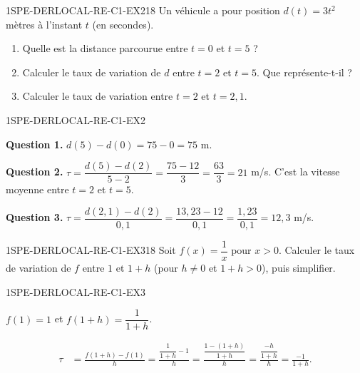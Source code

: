 \begin{exercice}{1SPE-DERLOCAL-RE-C1-EX2}{1}{8}
Un véhicule a pour position $d(t) = 3t^2$ mètres à l'instant $t$ (en secondes).
\begin{enumerate}
  \item Quelle est la distance parcourue entre $t=0$ et $t=5$ ?
  \item Calculer le taux de variation de $d$ entre $t=2$ et $t=5$. Que représente-t-il ?
  \item Calculer le taux de variation entre $t=2$ et $t=2{,}1$.
\end{enumerate}
\end{exercice}


\begin{corrige}{1SPE-DERLOCAL-RE-C1-EX2}

\textbf{Question 1.}
$d(5) - d(0) = 75 - 0 = 75$ m.


\textbf{Question 2.}
$\tau = \dfrac{d(5)-d(2)}{5-2} = \dfrac{75-12}{3} = \dfrac{63}{3} = 21$ m/s. C'est la vitesse moyenne entre $t=2$ et $t=5$.

\textbf{Question 3.}
$\tau = \dfrac{d(2{,}1)-d(2)}{0{,}1} = \dfrac{13{,}23-12}{0{,}1} = \dfrac{1{,}23}{0{,}1} = 12{,}3$ m/s.

\end{corrige}


\begin{exercice}{1SPE-DERLOCAL-RE-C1-EX3}{1}{8}
Soit $f(x) = \dfrac{1}{x}$ pour $x > 0$. Calculer le taux de variation de $f$ entre $1$ et $1+h$ (pour $h
\neq 0$ et $1+h > 0$), puis simplifier.
\end{exercice}


\begin{corrige}{1SPE-DERLOCAL-RE-C1-EX3}

$f(1) = 1$ et $f(1+h) = \dfrac{1}{1+h}$.

\begin{align*}
\tau &= \frac{f(1+h)-f(1)}{h} = \frac{\dfrac{1}{1+h} - 1}{h} = \frac{\dfrac{1-(1+h)}{1+h}}{h} = \frac{\dfrac{-h}{1+h}}{h} = \frac{-1}{1+h}.
\end{align*}

\end{corrige}
